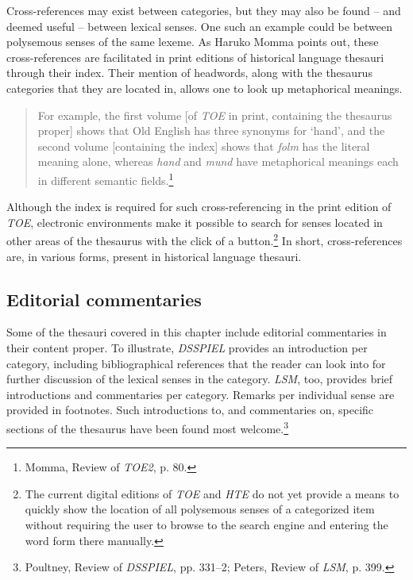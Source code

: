 Cross-references may exist between categories, but they may also be found -- and deemed useful -- between lexical senses. One such an example could be between polysemous senses of the same lexeme. As Haruko Momma points out, these cross-references are facilitated in print editions of historical language thesauri through their index. Their mention of headwords, along with the thesaurus categories that they are located in, allows one to look up metaphorical meanings.
\begin{quotation} \noindent
For example, the first volume [of \textit{TOE} in print, containing the thesaurus proper] shows that Old English has three synonyms for `hand', and the second volume [containing the index] shows that \textit{folm} has the literal meaning alone, whereas \textit{hand} and \textit{mund} have metaphorical meanings each in different semantic fields.\footnote{Momma, Review of \textit{TOE2}, %
p. 80.}
\end{quotation}
Although the index is required for such cross-referencing in the print edition of \textit{TOE}, electronic environments make it possible to search for senses located in other areas of the thesaurus with the click of a button.\footnote{The current digital editions of \textit{TOE} and \textit{HTE} do not yet provide a means to quickly show the location of all polysemous senses of a categorized item without requiring the user to browse to the search engine and entering the word form there manually.} In short, cross-references are, in various forms, present in historical language thesauri.

\subsection{Editorial commentaries}
\label{sect:Stolk_thes-content:EditorialCommentaries}

Some of the thesauri covered in this chapter include editorial commentaries in their content proper. 
To illustrate, \textit{DSSPIEL} provides an introduction per category, including bibliographical references that the reader can look into for further discussion of the lexical senses in the category. \textit{LSM}, too, provides brief introductions and commentaries per category. Remarks per individual sense are provided in footnotes. Such introductions to, and commentaries on, specific sections of the thesaurus have been found most welcome.\footnote{Poultney, Review of \textit{DSSPIEL}, %
pp. 331–2; Peters, Review of \textit{LSM}, p. 399.} 

